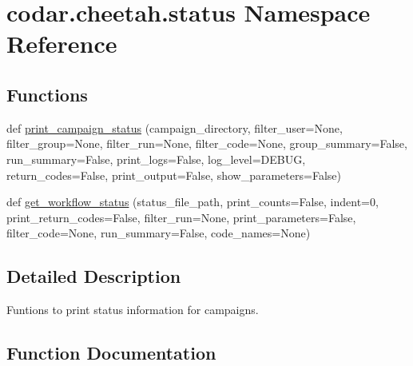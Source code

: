 \hypertarget{namespacecodar_1_1cheetah_1_1status}{}\section{codar.\+cheetah.\+status Namespace Reference}
\label{namespacecodar_1_1cheetah_1_1status}
\subsection*{Functions}
\begin{DoxyCompactItemize}
\item 
def \hyperlink{namespacecodar_1_1cheetah_1_1status_ae435d1016a5cd6b962afc42f79dfaee7}{print\+\_\+campaign\+\_\+status} (campaign\+\_\+directory, filter\+\_\+user=None, filter\+\_\+group=None, filter\+\_\+run=None, filter\+\_\+code=None, group\+\_\+summary=False, run\+\_\+summary=False, print\+\_\+logs=False, log\+\_\+level=\textquotesingle{}D\+E\+B\+UG\textquotesingle{}, return\+\_\+codes=False, print\+\_\+output=False, show\+\_\+parameters=False)
\item 
def \hyperlink{namespacecodar_1_1cheetah_1_1status_aa997b81b446e69764c6d42790211e187}{get\+\_\+workflow\+\_\+status} (status\+\_\+file\+\_\+path, print\+\_\+counts=False, indent=0, print\+\_\+return\+\_\+codes=False, filter\+\_\+run=None, print\+\_\+parameters=False, filter\+\_\+code=None, run\+\_\+summary=False, code\+\_\+names=None)
\end{DoxyCompactItemize}


\subsection{Detailed Description}
\begin{DoxyVerb}Funtions to print status information for campaigns.
\end{DoxyVerb}
 

\subsection{Function Documentation}
\mbox{\label{namespacecodar_1_1cheetah_1_1status_aa997b81b446e69764c6d42790211e187}} 
